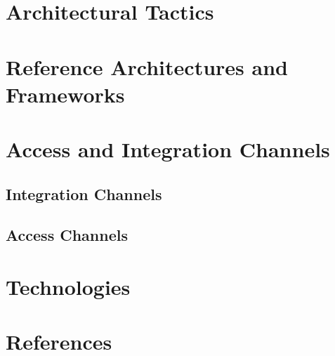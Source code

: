 \documentclass[a4paper,12pt]{article}
\begin{document}
	
	\section{Architectural Tactics}
	
	
	\section{Reference Architectures and Frameworks}
	

	\section{Access and Integration Channels}
		\subsection{Integration Channels}
		
		
		\subsection{Access Channels}
		

	\section{Technologies}
	
	
	
	\section{References}
	
	
\end{document}
